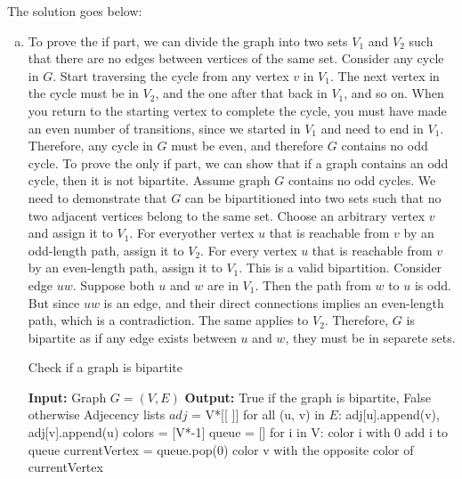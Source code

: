\documentclass[10pt]{article}
\begin{document}
\begin{solution}
    The solution goes below:
    \begin{enumerate}[(a)]
        \item  To prove the if part, we can divide the graph into two sets $V_1$ and $V_2$ such that there are no edges between vertices of the same set. 
        Consider any cycle in $G$. Start traversing the cycle from any vertex $v$ in $V_1$. The next vertex in the cycle must be in $V_2$, and the one after that back in $V_1$, and so on. When you return to the starting vertex to complete the cycle, you must have made an even number of transitions,
         since we started in $V_1$ and need to end in $V_1$. Therefore, any cycle in $G$ must be even, and therefore $G$ contains no odd cycle. To prove the only if part, we can show that if a graph contains an odd cycle, then it is not bipartite.
         Assume graph $G$ contains no odd cycles. We need to demonstrate that $G$ can be bipartitioned into two sets such that no two adjacent vertices belong to the same set. Choose an arbitrary vertex $v$ and assign it to $V_1$. For everyother vertex $u$ that is reachable from $v$ by an odd-length path, assign it to $V_2$. For every vertex $u$ that is reachable from $v$ by an even-length path, assign it to $V_1$. 
         This is a valid bipartition. Consider edge $uw$. Suppose both $u$ and $w$ are in $V_1$. Then the path from $w$ to $u$ is odd. But since $uw$ is an edge, and their direct connections implies an even-length path, which is a contradiction. The same applies to $V_2$. Therefore, $G$ is bipartite as if any edge exists between $u$ and $w$, they must be in separete sets.
        \begin{algorithm}
            \caption{Check if a graph is bipartite} 
            \begin{algorithmic}[1]
            \Statex \textbf{Input:} Graph $G=(V,E)$
            \Statex \textbf{Output:} True if the graph is bipartite, False otherwise
            \State Adjecency lists $adj$ = V*[[ ]]
            \State for all (u, v) in $E$: adj[u].append(v), adj[v].append(u)
            \State colors = [V*-1]
            \State queue = []
            \State for i in V: 
                    \State  color i with 0
                    \State add i to queue
                        \State currentVertex = queue.pop(0)
                                \State color v with the opposite color of currentVertex

\end{algorithmic}
\end{algorithm}
\end{enumerate}
\end{solution}
\end{document}
